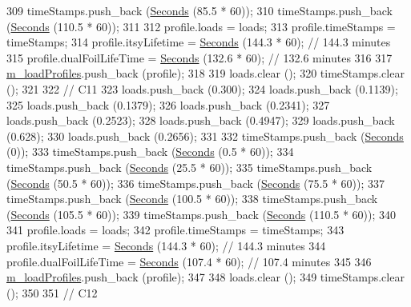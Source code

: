 \begin{DoxyCode}
309   timeStamps.push\_back (\hyperlink{group__timecivil_ga33c34b816f8ff6628e33d5c8e9713b9e}{Seconds} (85.5 * 60));
310   timeStamps.push\_back (\hyperlink{group__timecivil_ga33c34b816f8ff6628e33d5c8e9713b9e}{Seconds} (110.5 * 60));
311 
312   profile.loads = loads;
313   profile.timeStamps = timeStamps;
314   profile.itsyLifetime = \hyperlink{group__timecivil_ga33c34b816f8ff6628e33d5c8e9713b9e}{Seconds} (144.3 * 60);      \textcolor{comment}{// 144.3 minutes}
315   profile.dualFoilLifeTime = \hyperlink{group__timecivil_ga33c34b816f8ff6628e33d5c8e9713b9e}{Seconds} (132.6 * 60);  \textcolor{comment}{// 132.6 minutes}
316 
317   \hyperlink{classBatteryLifetimeTest_aee9ad324da18f58ee75689778580c3fb}{m\_loadProfiles}.push\_back (profile);
318 
319   loads.clear ();
320   timeStamps.clear ();
321 
322   \textcolor{comment}{// C11}
323   loads.push\_back (0.300);
324   loads.push\_back (0.1139);
325   loads.push\_back (0.1379);
326   loads.push\_back (0.2341);
327   loads.push\_back (0.2523);
328   loads.push\_back (0.4947);
329   loads.push\_back (0.628);
330   loads.push\_back (0.2656);
331 
332   timeStamps.push\_back (\hyperlink{group__timecivil_ga33c34b816f8ff6628e33d5c8e9713b9e}{Seconds} (0));
333   timeStamps.push\_back (\hyperlink{group__timecivil_ga33c34b816f8ff6628e33d5c8e9713b9e}{Seconds} (0.5 * 60));
334   timeStamps.push\_back (\hyperlink{group__timecivil_ga33c34b816f8ff6628e33d5c8e9713b9e}{Seconds} (25.5 * 60));
335   timeStamps.push\_back (\hyperlink{group__timecivil_ga33c34b816f8ff6628e33d5c8e9713b9e}{Seconds} (50.5 * 60));
336   timeStamps.push\_back (\hyperlink{group__timecivil_ga33c34b816f8ff6628e33d5c8e9713b9e}{Seconds} (75.5 * 60));
337   timeStamps.push\_back (\hyperlink{group__timecivil_ga33c34b816f8ff6628e33d5c8e9713b9e}{Seconds} (100.5 * 60));
338   timeStamps.push\_back (\hyperlink{group__timecivil_ga33c34b816f8ff6628e33d5c8e9713b9e}{Seconds} (105.5 * 60));
339   timeStamps.push\_back (\hyperlink{group__timecivil_ga33c34b816f8ff6628e33d5c8e9713b9e}{Seconds} (110.5 * 60));
340 
341   profile.loads = loads;
342   profile.timeStamps = timeStamps;
343   profile.itsyLifetime = \hyperlink{group__timecivil_ga33c34b816f8ff6628e33d5c8e9713b9e}{Seconds} (144.3 * 60);      \textcolor{comment}{// 144.3 minutes}
344   profile.dualFoilLifeTime = \hyperlink{group__timecivil_ga33c34b816f8ff6628e33d5c8e9713b9e}{Seconds} (107.4 * 60);  \textcolor{comment}{// 107.4 minutes}
345 
346   \hyperlink{classBatteryLifetimeTest_aee9ad324da18f58ee75689778580c3fb}{m\_loadProfiles}.push\_back (profile);
347 
348   loads.clear ();
349   timeStamps.clear ();
350 
351   \textcolor{comment}{// C12}

\end{DoxyCode}
